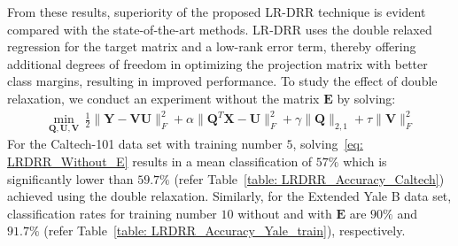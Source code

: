 From these results, superiority of the proposed LR-DRR technique is evident compared with the state-of-the-art methods. LR-DRR uses the double relaxed regression for the target matrix and a low-rank error term, thereby offering additional degrees of freedom in optimizing the projection matrix with better class margins, resulting in improved performance. To study the effect of double relaxation, we conduct an experiment without the matrix $\mathbf{E}$ by solving:
%
\begin{align}
   \label{eq: LRDRR_Without_E}
   \min_{\mathbf{Q}, \mathbf{U}, \mathbf{V}} \, \frac{1}{2} \| \mathbf{Y} - \mathbf{V} \mathbf{U} \|_{F}^{2} + \alpha \| \mathbf{Q}^{T} \mathbf{X} - \mathbf{U} \|_{F}^{2} + \gamma \| \mathbf{Q} \|_{2,1} + \tau \| \mathbf{V} \|_{F}^{2}
\end{align}
For the Caltech-101 data set with training number $5$, solving~\eqref{eq: LRDRR_Without_E} results in a mean classification of $57\%$ which is significantly lower than $59.7\%$ (refer Table~\ref{table: LRDRR_Accuracy_Caltech}) achieved using the double relaxation. Similarly, for the Extended Yale B data set, classification rates for training number $10$ without and with $\mathbf{E}$ are $90\%$ and $91.7\%$ (refer Table~\ref{table: LRDRR_Accuracy_Yale_train}), respectively.

